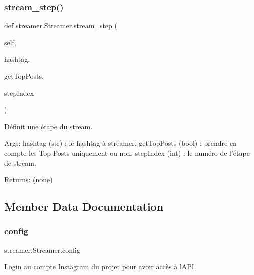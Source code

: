 \subsubsection{\texorpdfstring{stream\+\_\+step()}{stream\_step()}}
{\footnotesize\ttfamily def streamer.\+Streamer.\+stream\+\_\+step (\begin{DoxyParamCaption}\item[{}]{self,  }\item[{}]{hashtag,  }\item[{}]{get\+Top\+Posts,  }\item[{}]{step\+Index }\end{DoxyParamCaption})}

\begin{DoxyVerb}Définit une étape du stream.

Args:
    hashtag (str) : le hashtag à streamer.
    getTopPosts (bool) : prendre en compte les Top Posts uniquement ou non.
    stepIndex (int) : le numéro de l'étape de stream.

Returns:
    (none)
\end{DoxyVerb}
 

\subsection{Member Data Documentation}
\mbox{\label{classstreamer_1_1_streamer_a8277cc626d919a135a8c7f2b1c8d48b7}} 
\subsubsection{\texorpdfstring{config}{config}}
{\footnotesize\ttfamily streamer.\+Streamer.\+config}



Login au compte Instagram du projet pour avoir accès à l\textquotesingle{}A\+PI. 

\paragraph*{}\mbox{\label{classstreamer_1_1_streamer_a9e80f10c0b27f7f88d401ce838975640}} 
